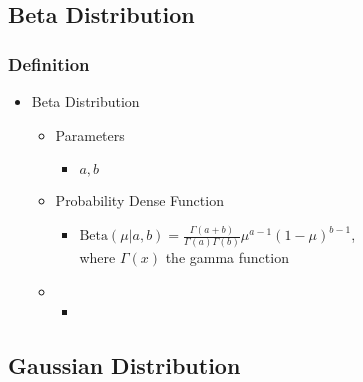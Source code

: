 \subsection{Beta Distribution}

\subsubsection{Definition}
\begin{itemize}
\item Beta Distribution
	\begin{itemize}
	\item Parameters
		\begin{itemize}
		\item $a, b$
		\end{itemize}
	\item Probability Dense Function
		\begin{itemize}
		\item $\text{Beta}(\mu|a, b) = \frac{\Gamma(a+b)}{\Gamma(a)\Gamma(b)} \mu^{a-1}(1-\mu)^{b-1}$, \\
		where $\Gamma(x)$ the gamma function
		\end{itemize}
	\item 
		\begin{itemize}
		\item 
		\end{itemize}
	\end{itemize}

\end{itemize}


\subsection{Gaussian Distribution}
 
